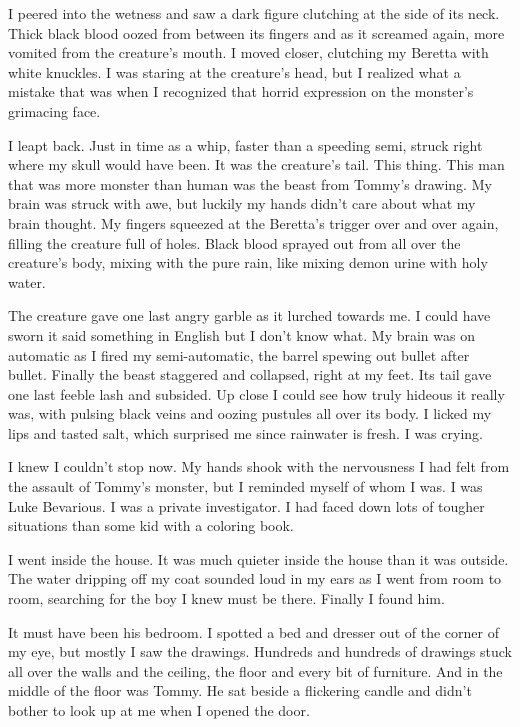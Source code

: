 I peered into the wetness and saw a dark figure clutching at the
side of its neck. Thick black blood oozed from between its fingers
and as it screamed again, more vomited from the creature's
mouth. I moved closer, clutching my Beretta with white knuckles. I
was staring at the creature's head, but I realized what a
mistake that was when I recognized that horrid expression on the
monster's grimacing face.



I leapt back. Just in time as a whip, faster than a speeding semi,
struck right where my skull would have been. It was the
creature's tail. This thing. This man that was more monster
than human was the beast from Tommy's drawing. My brain was
struck with awe, but luckily my hands didn't care about what
my brain thought. My fingers squeezed at the Beretta's
trigger over and over again, filling the creature full of holes.
Black blood sprayed out from all over the creature's body,
mixing with the pure rain, like mixing demon urine with holy
water.



The creature gave one last angry garble as it lurched towards me. I
could have sworn it said something in English but I don't
know what. My brain was on automatic as I fired my semi-automatic,
the barrel spewing out bullet after bullet. Finally the beast
staggered and collapsed, right at my feet. Its tail gave one last
feeble lash and subsided. Up close I could see how truly hideous it
really was, with pulsing black veins and oozing pustules all over
its body. I licked my lips and tasted salt, which surprised me
since rainwater is fresh. I was crying.



I knew I couldn't stop now. My hands shook with the
nervousness I had felt from the assault of Tommy's monster,
but I reminded myself of whom I was. I was Luke Bevarious. I was a
private investigator. I had faced down lots of tougher situations
than some kid with a coloring book.



I went inside the house. It was much quieter inside the house than
it was outside. The water dripping off my coat sounded loud in my
ears as I went from room to room, searching for the boy I knew must
be there. Finally I found him.



It must have been his bedroom. I spotted a bed and dresser out of
the corner of my eye, but mostly I saw the drawings. Hundreds and
hundreds of drawings stuck all over the walls and the ceiling, the
floor and every bit of furniture. And in the middle of the floor
was Tommy. He sat beside a flickering candle and didn't
bother to look up at me when I opened the door.



